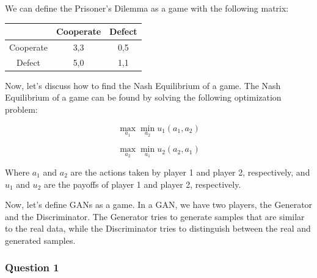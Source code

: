 We can define the Prisoner’s Dilemma as a game with the following matrix:

\begin{center}
\begin{tabular}{c|c|c}
 & Cooperate & Defect \\
\hline
Cooperate & 3,3 & 0,5 \\
\hline
Defect & 5,0 & 1,1 \\
\end{tabular}
\end{center}

Now, let's discuss how to find the Nash Equilibrium of a game. The Nash Equilibrium of a game can be found by solving the following optimization problem:

\[
\max_{a_1} \min_{a_2} u_1(a_1, a_2)
\]

\[
\max_{a_2} \min_{a_1} u_2(a_2, a_1)
\]

Where $a_1$ and $a_2$ are the actions taken by player 1 and player 2, respectively, and $u_1$ and $u_2$ are the payoffs of player 1 and player 2, respectively.

Now, let’s define GANs as a game. In a GAN, we have two players, the Generator and the Discriminator. The Generator tries to generate samples that are similar to the real data, while the Discriminator tries to distinguish between the real and generated samples.

\subsubsection{Question 1}

